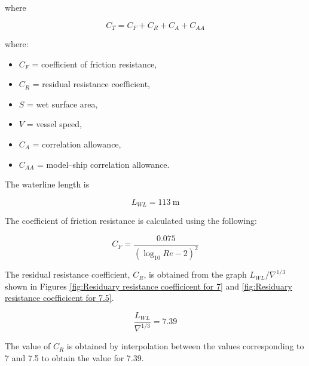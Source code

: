 \documentclass[12pt,a4paper,twoside]{report}
\begin{document}
\vspace{\baselineskip} \par \noindent where

\begin{equation}
C_T = C_F + C_R + C_A + C_{AA}
\label{eq : 2.15}
\end{equation}

\vspace{\baselineskip} \par \noindent where:
\begin{itemize}
    \item $C_F$ = coefficient of friction resistance,
    \item $C_R$ = residual resistance coefficient,
    \item $S$ = wet surface area,
    \item $V$ = vessel speed,
    \item $C_A$ = correlation allowance,
    \item $C_{AA}$ = model--ship correlation allowance.
\end{itemize}

\vspace{\baselineskip} \par \noindent The waterline length is

\[
L_{WL} = 113~\mathrm{m}
\]

\vspace{\baselineskip} \par \noindent The coefficient of friction resistance is calculated using the following:

\begin{equation}
C_F =
\frac{0.075}{(\log_{10}Re-2)^2}
\end{equation}


\vspace{\baselineskip} \par \noindent The residual resistance coefficient, $C_R$, is obtained from the
graph $L_{WL}/\nabla^{1/3}$ shown in Figures \ref{fig:Residuary resistance coefficicent for 7} and \ref{fig:Residuary resistance coefficicent for 7.5}.

\[
\frac{L_{WL}}{\nabla^{1/3}} = 7.39
\]

\vspace{\baselineskip} \par \noindent The value of $C_R$ is obtained by interpolation between the values
corresponding to 7 and 7.5 to obtain the value for 7.39.
\end{document}
